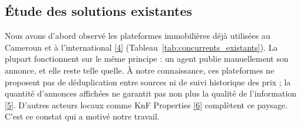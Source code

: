 \subsection{\'Etude des solutions existantes}
Nous avons d'abord observ\'e les plateformes immobili\`eres d\'ej\`a utilis\'ees au Cameroun et \`a l'international \hyperref[ref:ownkey_portals]{[4]} (Tableau~\ref{tab:concurrents_existants}). La plupart fonctionnent sur le m\^eme principe : un agent publie manuellement son annonce, et elle reste telle quelle. \`A notre connaissance, ces plateformes ne proposent pas de d\'eduplication entre sources ni de suivi historique des prix ; la quantit\'e d'annonces affich\'ees ne garantit pas non plus la qualit\'e de l'information \hyperref[ref:ownkey_nigeria]{[5]}. D'autres acteurs locaux comme KnF Properties \hyperref[ref:knf]{[6]} compl\`etent ce paysage. C'est ce constat qui a motiv\'e notre travail.
